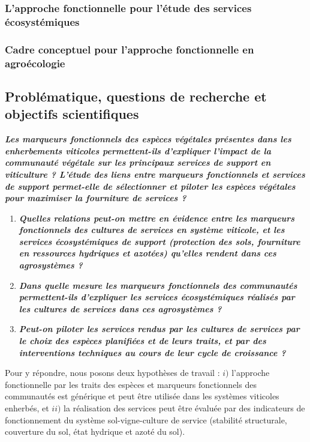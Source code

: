 \subsubsection{L'approche fonctionnelle pour l'étude des services écosystémiques}

\subsubsection{Cadre conceptuel pour l'approche fonctionnelle en agroécologie}

\subsection{Problématique, questions de recherche et objectifs scientifiques}

\medskip
\noindent\textbf{\textit{Les marqueurs fonctionnels des espèces végétales présentes dans les enherbements viticoles permettent-ils d'expliquer l'impact de la communauté végétale sur les principaux services de support en viticulture ? L'étude des liens entre marqueurs fonctionnels et services de support permet-elle de sélectionner et piloter les espèces végétales pour maximiser la fourniture de services ?}}
\medskip


\begin{enumerate}[leftmargin=*]
\item \textbf{\textit{Quelles relations peut-on mettre en évidence entre les marqueurs fonctionnels des cultures de services en système viticole, et les services écosystémiques de support (protection des sols, fourniture en ressources hydriques et azotées) qu'elles rendent dans ces agrosystèmes ?}}
\item \textbf{\textit{Dans quelle mesure les marqueurs fonctionnels des communautés permettent-ils d'expliquer les services écosystémiques réalisés par les cultures de services dans ces agrosystèmes ?}}
\item \textbf{\textit{Peut-on piloter les services rendus par les cultures de services par le choix des espèces planifiées et de leurs traits, et par des interventions techniques au cours de leur cycle de croissance ?}}
\end{enumerate}

Pour y répondre, nous posons deux hypothèses de travail : $i)$ l'approche fonctionnelle par les traits des espèces et marqueurs fonctionnels des communautés est générique et peut être utilisée dans les systèmes viticoles enherbés, et $ii)$ la réalisation des services peut être évaluée par des indicateurs de fonctionnement du système sol-vigne-culture de service (stabilité structurale, couverture du sol, état hydrique et azoté du sol). 

